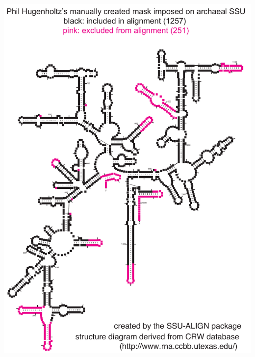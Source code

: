 \documentclass[landscape]{slides}
\begin{document}
\begin{slide}
\begin{center}
\includegraphics[height=8in]{figs/archaea-mask-ph-only}
\end{center}
\vfill
\end{slide}
\end{document}
